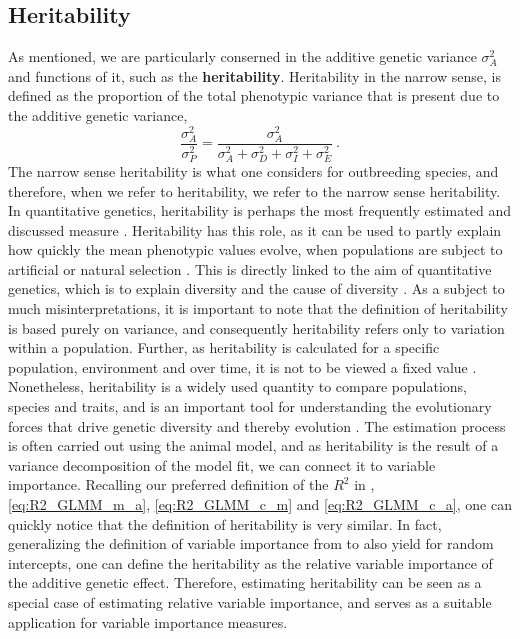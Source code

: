 \subsection*{Heritability}
\label{sec:heritability}
As mentioned, we are particularly conserned in the additive genetic variance $\sigma^2_A$ and functions of it, such as the \textbf{heritability}.
Heritability in the narrow sense, is defined as \citep{Wilson_heritability} the proportion of the total phenotypic variance that is present due to the additive genetic variance, 
\begin{equation}
    \label{eq:h2}
    \frac{\sigma^2_A}{\sigma^2_P} = \frac{\sigma^2_A}{\sigma^2_A + \sigma^2_D + \sigma^2_I + \sigma^2_E} \ .
\end{equation}
The narrow sense heritability is what one considers for outbreeding species, and therefore, when we refer to heritability, we refer to the narrow sense heritability.
In quantitative genetics, heritability is perhaps the most frequently estimated and discussed measure \citep{ConnerHartl2004}. Heritability has this role, as it can be used to partly explain how quickly the mean phenotypic values evolve, when populations are subject to artificial or natural selection \citep{ConnerHartl2004}. This is directly linked to the aim of quantitative genetics, which is to explain diversity and the cause of diversity \citep{Kruuk2004}. As a subject to much misinterpretations, it is important to note that the definition of heritability is based purely on variance, and consequently heritability refers only to variation within a population. Further, as heritability is calculated for a specific population, environment and over time, it is not to be viewed a fixed value \citep{ConnerHartl2004}. Nonetheless, heritability is a widely used quantity to compare populations, species and traits, and is an important tool for understanding the evolutionary forces that drive genetic diversity and thereby evolution \citep{ConnerHartl2004}. The estimation process is often carried out using the animal model, and as heritability is the result of a variance decomposition of the model fit, we can connect it to variable importance.
Recalling our preferred definition of the $R^2$ in , \eqref{eq:R2_GLMM_m_a}, \eqref{eq:R2_GLMM_c_m} and \eqref{eq:R2_GLMM_c_a}, one can quickly notice that the definition of heritability is very similar. In fact, generalizing the definition of variable importance from\citet{gromping_relaimpo} to also yield for random intercepts, one can define the heritability as the relative variable importance of the additive genetic effect. Therefore, estimating heritability can be seen as a special case of estimating relative variable importance, and serves as a suitable application for variable importance measures.
